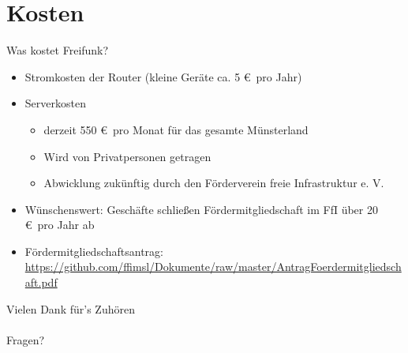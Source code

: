 \documentclass{beamer}
\begin{document}
\section{Kosten}
\begin{frame}{Was kostet Freifunk?}
	\begin{itemize}
		\item Stromkosten der Router (kleine Geräte ca. 5 \euro\ pro Jahr)
		\item Serverkosten
			\begin{itemize}
				\item derzeit 550 \euro\ pro Monat für das gesamte Münsterland
				\item Wird von Privatpersonen getragen
				\item Abwicklung zukünftig durch den Förderverein freie Infrastruktur e. V.
			\end{itemize}
		\item Wünschenswert: Geschäfte schließen Fördermitgliedschaft im FfI über 20 \euro\ pro Jahr ab
		\item Fördermitgliedschaftsantrag: {\tiny \href{https://github.com/ffimsl/Dokumente/raw/master/AntragFoerdermitgliedschaft.pdf}{https://github.com/ffimsl/Dokumente/raw/master/AntragFoerdermitgliedschaft.pdf}}
	\end{itemize}
\end{frame}
\begin{frame}
	\begin{center}
	\Huge Vielen Dank für's Zuhören
	\bigskip\\
	\ \bigskip\\
	Fragen?
	\end{center}
\end{frame}
\end{document}

